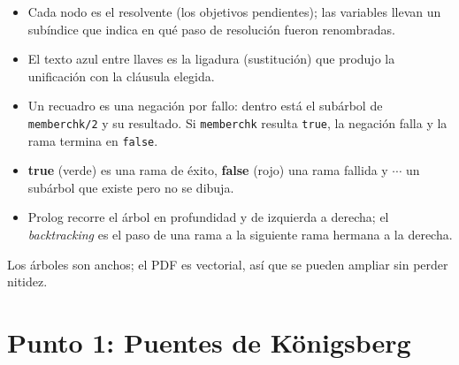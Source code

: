 \documentclass[12pt]{report}
\begin{document}
\begin{itemize}
    \item Cada nodo es el resolvente (los objetivos pendientes); las
          variables llevan un subíndice que indica en qué paso de
          resolución fueron renombradas.
    \item El texto azul entre llaves es la ligadura (sustitución) que
          produjo la unificación con la cláusula elegida.
    \item Un recuadro es una negación por fallo: dentro está el subárbol
          de \texttt{memberchk/2} y su resultado. Si \texttt{memberchk}
          resulta \texttt{true}, la negación falla y la rama termina en
          \texttt{false}.
    \item \textbf{true} (verde) es una rama de éxito, \textbf{false} (rojo)
          una rama fallida y $\cdots$ un subárbol que existe pero no se
          dibuja.
    \item Prolog recorre el árbol en profundidad y de izquierda a derecha;
          el \emph{backtracking} es el paso de una rama a la siguiente rama
          hermana a la derecha.
\end{itemize}

Los árboles son anchos; el PDF es vectorial, así que se pueden ampliar sin
perder nitidez.

\newpage


\chapter{Punto 1: Puentes de Königsberg}
\end{document}
